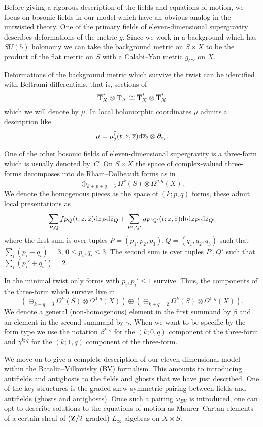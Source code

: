 Before giving a rigorous description of the fields and equations of motion, we focus on bosonic fields in our model which have an obvious analog in the untwisted theory. 
One of the primary fields of eleven-dimensional supergravity describes deformations of the metric $g$.
Since we work in a background which has $SU(5)$ holonomy we can take the background metric on $S \times X$ to be the product of the flat metric on $S$ with a Calabi--Yau metric $g_{CY}$ on $X$. 

Deformations of the background metric which survive the twist can be identified with Beltrami differentials, that is, sections of 
\[
\overline{{\rm T}}_X^* \otimes {\rm T}_X \cong \overline{{\rm T}}^*_X \otimes \overline{{\rm T}}_X^* 
\]
which we will denote by $\mu$. 
In local holomorphic coordinates $\mu$ admits a description like
\[
\mu = \mu^{\overline{i}}_j (t;z,\overline{z}) {\rm d} \overline{z}_{\overline{i}} \otimes \partial_{z_i} .
\]

One of the other bosonic fields of eleven-dimensional supergravity is a three-form which is usually denoted by~$C$. 
On $S \times X$ the space of complex-valued three-forms decomposes into de Rham--Dolbeault forms as in
\[
\oplus_{k+p+q=3} \Omega^k(S) \otimes \Omega^{p,q}(X) .
\]
We denote the homogenous pieces as the space of $(k;p,q)$ forms, these admit local presentations as
\[
\sum_{P,Q} f_{PQ} (t;z,\overline{z}) {\rm d} z_P {\rm d} \overline{z}_Q + \sum_{P',Q'} g_{P'Q'}(t;z,\overline{z}) {\rm d} t {\rm d} z_{P'}{\rm d} \overline{z}_{Q'} 
\]
where the first sum is over tuples $P=(p_1,p_2,p_3),Q=(q_1,q_2,q_3)$ such that $\sum_i (p_i + q_i) = 3$, $0 \leq p_i,q_i \leq 3$.
The second sum is over tuples $P',Q'$ such that $\sum_i (p_i'+q_i') = 2$. 

In the minimal twist only forms with $p_i ,p_i'\leq 1$ survive. 
Thus, the components of the three-form which survive live in
\[
\left(\oplus_{k+q = 3} \Omega^k(S) \otimes \Omega^{0,q}(X)\right) \oplus 
\left(\oplus_{k+q = 2} \Omega^k(S) \otimes \Omega^{1,q}(X)\right) .
\]
We denote a general (non-homogenous) element in the first summand by $\beta$ and an element in the second summand by $\gamma$.
When we want to be specific by the form type we use the notation $\beta^{k;q}$ for the $(k;0,q)$ component of the three-form and $\gamma^{k;q}$ for the $(k;1,q)$ component of the three-form.

\parsec[s:Lsugra]

We move on to give a complete description of our eleven-dimensional model within the Batalin--Vilkovisky (BV) formalism.
This amounts to introducing antifields and antighosts to the fields and ghosts that we have just described.
One of the key structures is the graded skew-symmetric pairing between fields and antifields (ghosts and antighosts).
Once such a pairing $\omega_{BV}$ is introduced, one can opt to describe solutions to the equations of motion as Maurer--Cartan elements of a certain sheaf of ($\mathbf{Z}/2$-graded) $L_\infty$ algebras on $X \times S$.


